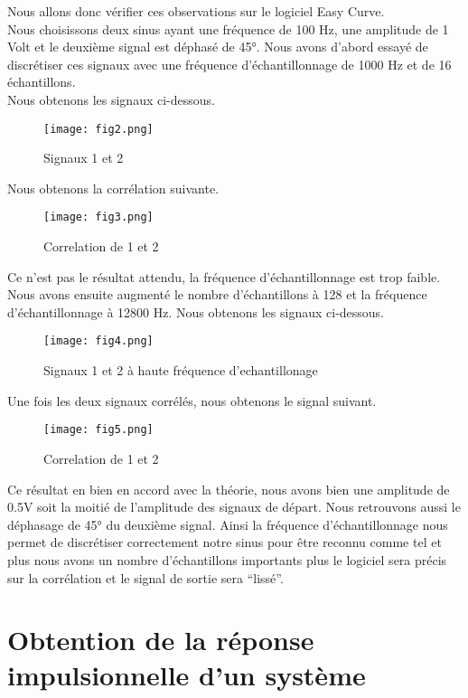 \documentclass[oneside,a4paper,12pt]{article}
\begin{document}
	Nous allons donc vérifier ces observations sur le logiciel Easy Curve.\\
	
	Nous choisissons deux sinus ayant une fréquence de 100 Hz, une amplitude de 1 Volt et le deuxième signal est déphasé de 45°. Nous avons d’abord essayé de discrétiser ces signaux avec une fréquence d'échantillonnage de 1000 Hz et de 16 échantillons.\\
	
	Nous obtenons les signaux ci-dessous.
	\begin{figure}[h]
		\centering
		\texttt{[image: fig2.png]}
		\caption{Signaux 1 et 2}
	\end{figure}

	Nous obtenons la corrélation suivante.
	
	\begin{figure}[h]
		\centering
		\texttt{[image: fig3.png]}
		\caption{Correlation de 1 et 2}
	\end{figure}

	Ce n’est pas le résultat attendu, la fréquence d'échantillonnage est trop faible.
	Nous avons ensuite augmenté le nombre d’échantillons à 128 et la fréquence d'échantillonnage à 12800 Hz. Nous obtenons les signaux ci-dessous.
	
	\begin{figure}[h]
		\centering
		\texttt{[image: fig4.png]}
		\caption{Signaux 1 et 2 à haute fréquence d'echantillonage}
	\end{figure}

	Une fois les deux signaux corrélés, nous obtenons le signal suivant.
	
	\begin{figure}[h]
		\centering
		\texttt{[image: fig5.png]}
		\caption{Correlation de 1 et 2}
	\end{figure}

	Ce résultat en bien en accord avec la théorie, nous avons bien une amplitude de 0.5V soit la moitié de l’amplitude des signaux de départ. Nous retrouvons aussi le déphasage de 45° du deuxième signal. Ainsi la fréquence d'échantillonnage nous permet de discrétiser correctement notre sinus pour être reconnu comme tel et plus nous avons un nombre d’échantillons importants plus le logiciel sera précis sur la corrélation et le signal de sortie sera “lissé”.
	
	\section{Obtention de la réponse impulsionnelle d’un système}
	
\end{document}
